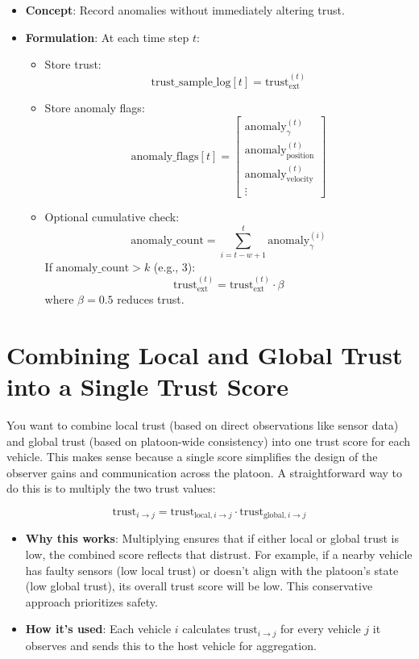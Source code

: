 \documentclass{article}
\begin{document}
\begin{itemize}
    \item \textbf{Concept}: Record anomalies without immediately altering trust.
    \item \textbf{Formulation}:  
    At each time step $t$:
    \begin{itemize}
        \item Store trust:
        \[
        \text{trust\_sample\_log}[t] = \text{trust}_{\text{ext}}^{(t)}
        \]
        \item Store anomaly flags:
        \[
        \text{anomaly\_flags}[t] = 
        \begin{bmatrix}
        \text{anomaly}_{\gamma}^{(t)} \\
        \text{anomaly}_{\text{position}}^{(t)} \\
        \text{anomaly}_{\text{velocity}}^{(t)} \\
        \vdots
        \end{bmatrix}
        \]
        \item Optional cumulative check:
        \[
        \text{anomaly\_count} = \sum_{i=t-w+1}^{t} \text{anomaly}_{\gamma}^{(i)}
        \]
        If $\text{anomaly\_count} > k$ (e.g., 3):
        \[
        \text{trust}_{\text{ext}}^{(t)} = \text{trust}_{\text{ext}}^{(t)} \cdot \beta
        \]
        where $\beta = 0.5$ reduces trust.
    \end{itemize}
\end{itemize}



\section{Combining Local and Global Trust into a Single Trust Score}
You want to combine local trust (based on direct observations like sensor data) and global trust (based on platoon-wide consistency) into one trust score for each vehicle. This makes sense because a single score simplifies the design of the observer gains and communication across the platoon. A straightforward way to do this is to multiply the two trust values:

\[
\text{trust}_{i \to j} = \text{trust}_{\text{local}, i \to j} \cdot \text{trust}_{\text{global}, i \to j}
\]

\begin{itemize}
    \item \textbf{Why this works}: Multiplying ensures that if either local or global trust is low, the combined score reflects that distrust. For example, if a nearby vehicle has faulty sensors (low local trust) or doesn't align with the platoon's state (low global trust), its overall trust score will be low. This conservative approach prioritizes safety.
    
    \item \textbf{How it's used}: Each vehicle \( i \) calculates \( \text{trust}_{i \to j} \) for every vehicle \( j \) it observes and sends this to the host vehicle for aggregation.
\end{itemize}
\end{document}
